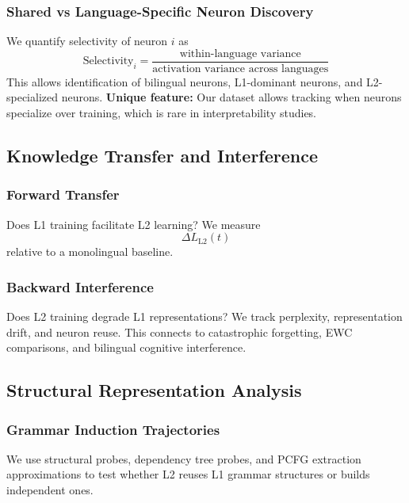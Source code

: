 \subsubsection{Shared vs Language-Specific Neuron Discovery}

We quantify selectivity of neuron $i$ as
\begin{equation}
\text{Selectivity}_i = \frac{\text{within-language variance}}{\text{activation variance across languages}}
\end{equation}
This allows identification of bilingual neurons, L1-dominant neurons, and L2-specialized neurons.  
\textbf{Unique feature:} Our dataset allows tracking when neurons specialize over training, which is rare in interpretability studies.

\subsection{Knowledge Transfer and Interference}

\subsubsection{Forward Transfer}

Does L1 training facilitate L2 learning?  
We measure
\begin{equation}
\Delta L_{\text{L2}}(t)
\end{equation}
relative to a monolingual baseline.

\subsubsection{Backward Interference}

Does L2 training degrade L1 representations?  
We track perplexity, representation drift, and neuron reuse.  
This connects to catastrophic forgetting, EWC comparisons, and bilingual cognitive interference.

\subsection{Structural Representation Analysis}

\subsubsection{Grammar Induction Trajectories}

We use structural probes, dependency tree probes, and PCFG extraction approximations to test whether L2 reuses L1 grammar structures or builds independent ones.

